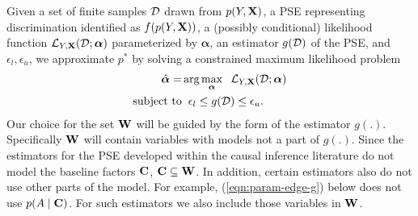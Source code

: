 \documentclass[letterpaper]{article} %
\begin{document}
Given a set of finite samples ${\cal D}$ drawn from $p(Y,{\bf X})$, a PSE representing discrimination identified as $f(p(Y,{\bf X}))$, a (possibly conditional) likelihood function ${\cal L}_{Y,{\bf X}}({\cal D}; {\bm\alpha})$ parameterized by $\bm\alpha$, an estimator $g({\cal D})$ of the PSE, and $\epsilon_l,\epsilon_u$, we approximate $p^*$ by solving a constrained maximum likelihood problem 
{\small
\begin{align}
\notag
\hat{\bm\alpha} = & \arg \max_{\bm\alpha} \hspace{0.2cm} {\cal L}_{Y, {\bf X}}({\cal D}; {\bm\alpha}) \\
 \text{subject to} & \hspace{0.2cm} \epsilon_l \leq g({\cal D}) \leq \epsilon_u.
 \label{eqn:c-mle}
\end{align}
}
Our choice for the set ${\bf W}$ will be guided by the form of the estimator $g(.)$.  Specifically ${\bf W}$ will contain variables with models not a part of $g(.)$. 
Since the estimators for the PSE developed within the causal inference literature do not model the baseline factors ${\bf C}$, ${\bf C} \subseteq {\bf W}$.  In addition,
certain estimators also do not use other parts of the model.  For example, (\ref{eqn:param-edge-g}) below does not use $p(A \mid {\bf C})$.  For such estimators we also
include those variables in ${\bf W}$.

%
%
\end{document}
